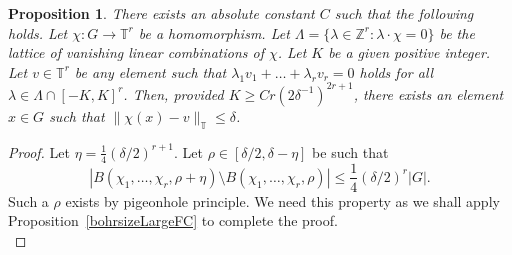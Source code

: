 \documentclass[a4paper,11pt]{article}
\numberwithin{theorem}{section}
\newtheorem{proposition}[theorem]{Proposition}
\theoremstyle{definition}
\begin{document}
\begin{proposition}\label{approximatelatticeimage}
    There exists an absolute constant $C$ such that the following holds. Let $\chi : G \to \mathbb{T}^r$ be a homomorphism. Let $\Lambda = \{\lambda \in \mathbb{Z}^r : \lambda \cdot \chi = 0\}$ be the lattice of vanishing linear combinations of $\chi$. Let $K$ be a given positive integer. Let $v \in \mathbb{T}^r$ be any element such that $\lambda_1 v_1 + \dots + \lambda_r v_r = 0$ holds for all $\lambda \in \Lambda \cap [-K, K]^r$. Then, provided $K \geq C r  (2\delta^{-1})^{2r + 1}$, there exists an element $x \in G$ such that $\|\chi(x) -v\|_{\mathbb{T}} \leq \delta$.
\end{proposition}

\begin{proof}
    Let $\eta = \frac{1}{4}(\delta/2)^{r+1}$. Let $\rho \in [\delta/2, \delta - \eta]$ be such that 
    \[|B(\chi_1, \dots, \chi_r, \rho + \eta) \setminus B(\chi_1, \dots, \chi_r, \rho)| \leq \frac{1}{4} (\delta/2)^r |G|.\]
    Such a $\rho$ exists by pigeonhole principle. We need this property as we shall apply Proposition~\ref{bohrsizeLargeFC} to complete the proof.\\
    

\end{proof}
\end{document}
